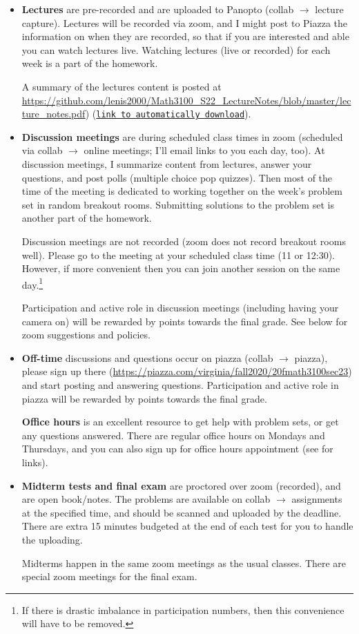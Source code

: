 \documentclass[oneside,11pt]{amsart}
\begin{document}
\begin{itemize}
	\item \textbf{Lectures} are pre-recorded and are uploaded to Panopto (collab $\to$ lecture capture). 
		Lectures will be recorded via zoom, and I might post to Piazza the information
		on when they are recorded, so that if you are interested and able you can watch lectures
		live.
		Watching lectures (live or recorded)
		for each week is a part of the homework.

		A summary of the lectures content is posted at 
		\url{https://github.com/lenis2000/Math3100_S22_LectureNotes/blob/master/lecture_notes.pdf})
		(\href{https://raw.githubusercontent.com/lenis2000/Math3100_S22_LectureNotes/master/lecture_notes.pdf}
		{\texttt{link to automatically download}}).
	\item \textbf{Discussion meetings} are during scheduled class times
		in zoom (scheduled via collab
		$\to$ online meetings; I'll email links to you each day, too). At
		discussion
		meetings, I summarize content from lectures, answer your 
		questions, and 
		post polls (multiple choice pop quizzes). Then most of the time
		of the meeting is dedicated to working together on the week's problem set in random breakout rooms.
		Submitting solutions to the problem set is another part of the homework.

		Discussion meetings are not recorded (zoom does not record breakout rooms well). 
		Please go to the meeting at your scheduled class time (11 or 12:30).
		However, if more convenient then 
		you can join another session on the same day.\footnote{If there is drastic imbalance
		in participation numbers, then this convenience will have to be removed.}

		Participation and active role in discussion meetings (including having 
		your camera on)
		will be rewarded by points towards the final grade.
		See  below for zoom suggestions and policies.

	\item \textbf{Off-time} discussions and questions 
		occur on piazza (collab $\to$ piazza), please sign up there 
		(\url{https://piazza.com/virginia/fall2020/20fmath3100sec23})
		and start
		posting and answering questions. 
		Participation and active role in piazza will be rewarded by points towards the final grade.

		\textbf{Office hours} is an excellent resource to get help with problem sets,
		or get any questions answered. There are regular office hours
		on Mondays and Thursdays, and you can also sign up for office hours appointment (see 
		for links).

	\item \textbf{Midterm tests and final exam} are proctored over zoom (recorded), and are open book/notes. 
		The problems are available on collab $\to$ assignments at the specified time, and 
		should be scanned and uploaded by the deadline. There are extra 15 minutes budgeted at the 
		end of each test for you to handle the uploading.

		Midterms happen in the same zoom meetings as the usual classes. There are special zoom meetings 
		for the final exam.
\end{itemize}
\end{document}
